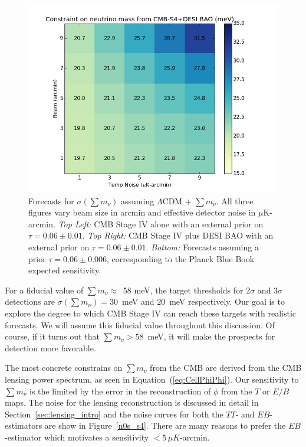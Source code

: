 \begin{figure}[h!]
\begin{center}
\includegraphics[scale=0.4]{Neutrinos/S4+DESI_BeamVsNoise_tauprior.png}

\caption{ Forecasts for $\sigma(\sum m_\nu)$ assuming $\Lambda$CDM + $\sum m_\nu$.  All three figures vary beam size in arcmin and effective detector noise in $\mu$K-arcmin. {\it Top Left:} CMB Stage IV alone with an external prior on $\tau = 0.06 \pm 0.01$. {\it Top Right: } CMB Stage IV plus DESI BAO  with an external prior on $\tau = 0.06 \pm 0.01$.  {\it Bottom:} Forecasts assuming a prior $\tau = 0.06 \pm 0.006$, corresponding to the Planck Blue Book expected sensitivity.}
\label{fig:mnuforecast}
\end{center}
\end{figure} 

For a fiducial value of $\sum m_\nu \approx$~58 meV, the target thresholds for 2$\sigma$ and 3$\sigma$ detections are $\sigma(\sum m_\nu) = 30$~meV and $20$~meV respectively.  Our goal is to explore the degree to which CMB Stage IV can reach these targets with realistic forecasts.  We will assume this fiducial value throughout this discussion.  Of course, if it turns out that $\sum m_\nu > 58$~meV, it will make the prospects for detection more favorable.  

The most concrete constrains on $\sum m_\nu$ from the CMB are derived from the CMB lensing power spectrum, as seen in Equation~(\ref{eq:CellPhiPhi}).  Our sensitivity to $\sum m_\nu$ is the limited by the error in the reconstruction of $\phi$ from the $T$ or $E/B$ maps.  The noise for the lensing reconstruction is discussed in detail in Section~\ref{sec:lensing_intro} and the noise curves for both the $TT$- and $EB$-estimators are show in Figure~\ref{n0s_s4}.  There are many reasons to prefer the $EB$-estimator which motivates a sensitivity $< 5 \, \mu K$-arcmin.  



